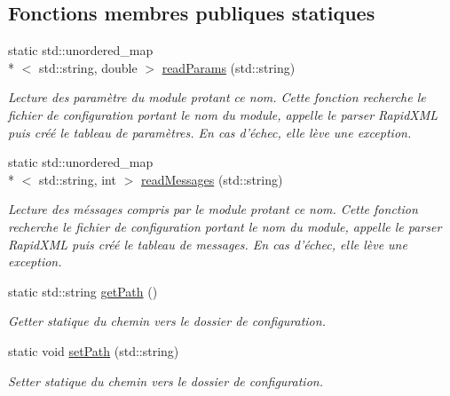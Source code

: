 \subsection*{Fonctions membres publiques statiques}
\begin{DoxyCompactItemize}
\item 
static std\-::unordered\-\_\-map\\*
$<$ std\-::string, double $>$ \hyperlink{classXMLReader_a176f21253bd7ac73c00c0aa46e2e5724}{read\-Params} (std\-::string)
\begin{DoxyCompactList}\small\item\em Lecture des paramètre du module protant ce nom. Cette fonction recherche le fichier de configuration portant le nom du module, appelle le parser Rapid\-X\-M\-L puis créé le tableau de paramètres. En cas d'échec, elle lève une exception. \end{DoxyCompactList}\item 
\hypertarget{classXMLReader_aa21f5dcd9d009e635c6acad97beb240a}{static std\-::unordered\-\_\-map\\*
$<$ std\-::string, int $>$ \hyperlink{classXMLReader_aa21f5dcd9d009e635c6acad97beb240a}{read\-Messages} (std\-::string)}\label{classXMLReader_aa21f5dcd9d009e635c6acad97beb240a}

\begin{DoxyCompactList}\small\item\em Lecture des méssages compris par le module protant ce nom. Cette fonction recherche le fichier de configuration portant le nom du module, appelle le parser Rapid\-X\-M\-L puis créé le tableau de messages. En cas d'échec, elle lève une exception. \end{DoxyCompactList}\item 
\hypertarget{classXMLReader_a5147abbb0cacd3fbcc396a23cc63456b}{static std\-::string \hyperlink{classXMLReader_a5147abbb0cacd3fbcc396a23cc63456b}{get\-Path} ()}\label{classXMLReader_a5147abbb0cacd3fbcc396a23cc63456b}

\begin{DoxyCompactList}\small\item\em Getter statique du chemin vers le dossier de configuration. \end{DoxyCompactList}\item 
\hypertarget{classXMLReader_ae8d2d4fd99c45bc46b939d9dc3548340}{static void \hyperlink{classXMLReader_ae8d2d4fd99c45bc46b939d9dc3548340}{set\-Path} (std\-::string)}\label{classXMLReader_ae8d2d4fd99c45bc46b939d9dc3548340}

\begin{DoxyCompactList}\small\item\em Setter statique du chemin vers le dossier de configuration. \end{DoxyCompactList}\end{DoxyCompactItemize}


